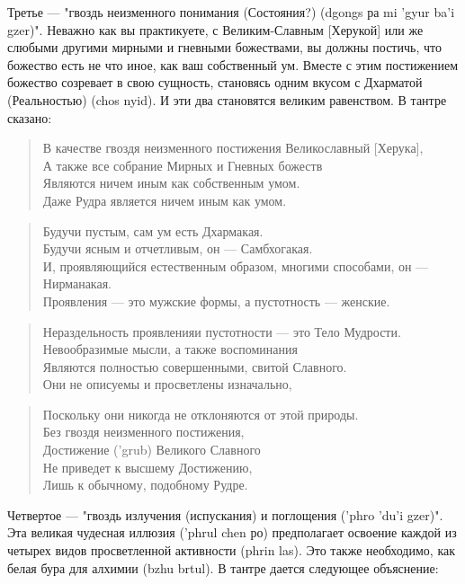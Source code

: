 Третье — "гвоздь неизменного понимания (Состояния?) (dgongs ра mi 'gyur ba'i gzer)".
Неважно как вы практикуете, с Великим-Славным [Херукой] или же слюбыми другими
мирными и гневными божествами, вы должны постичь, что божество есть не что иное, как
ваш собственный ум. Вместе с этим постижением божество созревает в свою сущность,
становясь одним вкусом с Дхарматой (Реальностью) (chos nyid). И эти два становятся великим
равенством. В тантре сказано:

\begin{verse}
В качестве гвоздя неизменного постижения Великославный [Херука],\\
А также все собрание Мирных и Гневных божеств\\
Являются ничем иным как собственным умом.\\
Даже Рудра является ничем иным как умом.\\
\end{verse}
\newpage
\begin{verse}
Будучи пустым, сам ум есть Дхармакая.\\
Будучи ясным и отчетливым, он — Самбхогакая.\\
И, проявляющийся естественным образом, многими способами, он — Нирманакая.\\
Проявления — это мужские формы, а пустотность — женские.\\
\end{verse}

\begin{verse}
Нераздельность проявленияи пустотности — это Тело Мудрости.\\
Невообразимые мысли, а также воспоминания\\
Являются полностью совершенными, свитой Славного.\\
Они не описуемы и просветлены изначально,\\
\end{verse}

\begin{verse}
Поскольку они никогда не отклоняются от этой природы.\\
Без гвоздя неизменного постижения,\\
Достижение ('grub) Великого Славного\\
Не приведет к высшему Достижению,\\
Лишь к обычному, подобному Рудре.
\end{verse}

Четвертое — "гвоздь излучения (испускания) и поглощения ('phro 'du'i gzer)". Эта
великая чудесная иллюзия ('phrul chen ро) предполагает освоение каждой из четырех видов
просветленной активности (phrin las). Это также необходимо, как белая бура для алхимии
(bzhu brtul). В тантре дается следующее объяснение:

